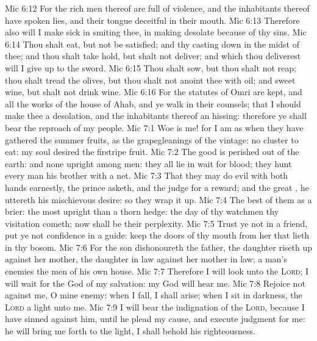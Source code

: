 \vs Mic 6:12 For the rich men thereof are full of violence, and the inhabitants thereof have spoken lies, and their tongue  deceitful in their mouth.
\vs Mic 6:13 Therefore also will I make  sick in smiting thee, in making  desolate because of thy sins.
\vs Mic 6:14 Thou shalt eat, but not be satisfied; and thy casting down  in the midst of thee; and thou shalt take hold, but shalt not deliver; and  which thou deliverest will I give up to the sword.
\vs Mic 6:15 Thou shalt sow, but thou shalt not reap; thou shalt tread the olives, but thou shalt not anoint thee with oil; and sweet wine, but shalt not drink wine.
\vs Mic 6:16 For the statutes of Omri are kept, and all the works of the house of Ahab, and ye walk in their counsels; that I should make thee a desolation, and the inhabitants thereof an hissing: therefore ye shall bear the reproach of my people.
\vs Mic 7:1 Woe is me! for I am as when they have gathered the summer fruits, as the grapegleanings of the vintage:  no cluster to eat: my soul desired the firstripe fruit.
\vs Mic 7:2 The good  is perished out of the earth: and  none upright among men: they all lie in wait for blood; they hunt every man his brother with a net.
\vs Mic 7:3 That they may do evil with both hands earnestly, the prince asketh, and the judge  for a reward; and the great , he uttereth his mischievous desire: so they wrap it up.
\vs Mic 7:4 The best of them  as a brier: the most upright  than a thorn hedge: the day of thy watchmen  thy visitation cometh; now shall be their perplexity.
\vs Mic 7:5 Trust ye not in a friend, put ye not confidence in a guide: keep the doors of thy mouth from her that lieth in thy bosom.
\vs Mic 7:6 For the son dishonoureth the father, the daughter riseth up against her mother, the daughter in law against her mother in law; a man's enemies  the men of his own house.
\vs Mic 7:7 Therefore I will look unto the \textsc{Lord}; I will wait for the God of my salvation: my God will hear me.
\vs Mic 7:8 Rejoice not against me, O mine enemy: when I fall, I shall arise; when I sit in darkness, the \textsc{Lord}  a light unto me.
\vs Mic 7:9 I will bear the indignation of the \textsc{Lord}, because I have sinned against him, until he plead my cause, and execute judgment for me: he will bring me forth to the light,  I shall behold his righteousness.

